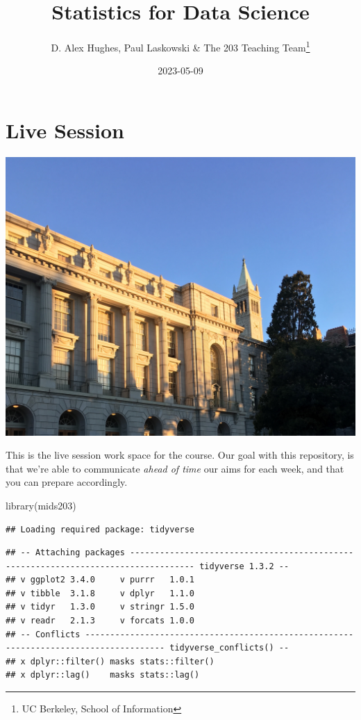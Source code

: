 \documentclass[
]{book}
\title{Statistics for Data Science}
\author{D. Alex Hughes, Paul Laskowski \& The 203 Teaching Team\footnote{UC Berkeley, School of Information}}
\date{2023-05-09}
\newenvironment{Shaded}{\begin{snugshade}}{\end{snugshade}}
\newcommand{\FunctionTok}[1]{\textcolor[rgb]{0.00,0.00,0.00}{#1}}
\newcommand{\NormalTok}[1]{#1}
\theoremstyle{definition}
\theoremstyle{definition}
\theoremstyle{definition}
\theoremstyle{definition}
\theoremstyle{remark}
\begin{document}
\maketitle

{
\setcounter{tocdepth}{1}
\tableofcontents
}
\hypertarget{live-session}{%
\chapter*{Live Session}\label{live-session}}

\includegraphics{./images/campus.jpeg}

This is the live session work space for the course. Our goal with this repository, is that we're able to communicate \emph{ahead of time} our aims for each week, and that you can prepare accordingly.

\begin{Shaded}
\begin{Highlighting}[]
\FunctionTok{library}\NormalTok{(mids203)}
\end{Highlighting}
\end{Shaded}

\begin{verbatim}
## Loading required package: tidyverse
\end{verbatim}

\begin{verbatim}
## -- Attaching packages ----------------------------------------------------------------------------------- tidyverse 1.3.2 --
## v ggplot2 3.4.0     v purrr   1.0.1
## v tibble  3.1.8     v dplyr   1.1.0
## v tidyr   1.3.0     v stringr 1.5.0
## v readr   2.1.3     v forcats 1.0.0
## -- Conflicts -------------------------------------------------------------------------------------- tidyverse_conflicts() --
## x dplyr::filter() masks stats::filter()
## x dplyr::lag()    masks stats::lag()
\end{verbatim}
\end{document}
